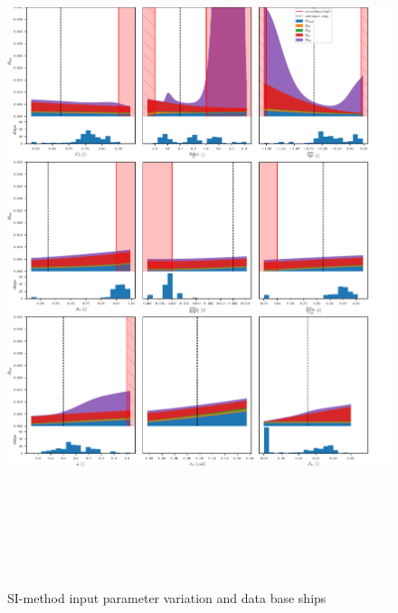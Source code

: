 \begin{figure}[H]
    \centering
    \includegraphics[width=6in, height = 8in ]{figures/SI-sensitivity.pdf}
        \vspace{-0.5cm}
    \caption{SI-method input parameter variation and data base ships}
    \label{fig:SI_sensitivity}
\end{figure}

